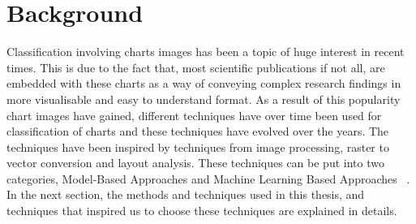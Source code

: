\documentclass[12pt, a4paper,oneside]{report}
\begin{document}
\section{Background}
Classification involving charts images has been a topic of huge interest in recent times. This is due to the fact that, most scientific publications if not all, are embedded with these charts as a way of conveying complex research findings in more visualisable and easy to understand format. As a result of this popularity chart images have gained, different techniques have over time been used for classification of charts and these techniques have evolved over the years. The techniques have been inspired by techniques from image processing, raster to vector conversion and layout analysis. These techniques can be put into two categories, Model-Based Approaches and Machine Learning Based Approaches ~\cite{amara2017convolutional}. In the next section, the methods and techniques used in this thesis, and techniques that inspired us to choose these techniques are explained in details.
\end{document}
